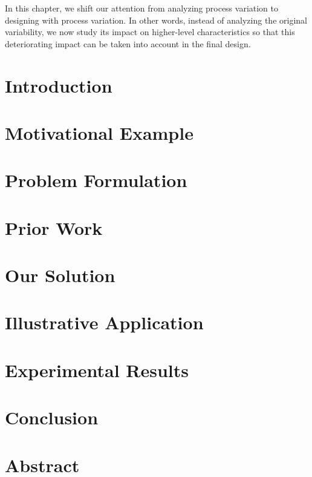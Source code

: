 In this chapter, we shift our attention from analyzing process variation to
designing with process variation. In other words, instead of analyzing the
original variability, we now study its impact on higher-level characteristics so
that this deteriorating impact can be taken into account in the final design.

\section{Introduction}

\section{Motivational Example}

\section{Problem Formulation}

\section{Prior Work}

\section{Our Solution}

\section{Illustrative Application}

\section{Experimental Results}

\section{Conclusion}

\section{Abstract}

